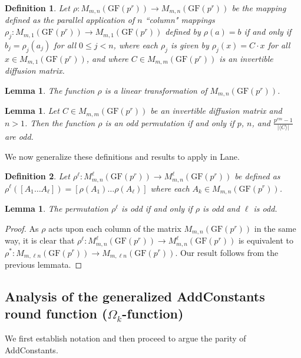 \documentclass[11pt]{amsart}
\newcommand{\GF}{\mathrm{GF}}
\newtheorem{definition}{{\bf Definition}}
\newtheorem{lemma}[theorem]{{\bf Lemma }}
\begin{document}
\begin{definition}
Let $\rho: M_{m,n}(\GF(p^r))\rightarrow M_{m,n}(\GF(p^r))$ be the mapping defined as the parallel application of $n$ ``column" mappings $\rho_j:M_{m,1}(\GF(p^r)) \to M_{m,1}(\GF(p^r))$ defined by $\rho(a)=b$ if and only if $b_j=\rho_j(a_j)$ for all $0 \le j < n$, where each $\rho_j$ is given by $\rho_j(x)=C\cdot x$ for all $x \in M_{m,1}(\GF(p^r))$, and where $C\in M_{m,m}(\GF(p^r)) $  is an invertible diffusion matrix.
\end{definition}
\begin{lemma}\label{MClinear} The function $\rho$  is a linear transformation of $M_{m,n}(\GF(p^r))$.
\end{lemma}
\begin{lemma}\label{MClemma}
Let $C\in M_{m,m}(\GF(p^r))$ be an invertible diffusion matrix and $n>1$.  Then the  function $\rho$ is an odd permutation if and only if  $p$, $n$, and $\frac{p^{rm}- 1}{\vert\langle C \rangle\vert}$ are odd.
\end{lemma}

We now generalize these definitions and results to apply in Lane.

\begin{definition}
Let $\rho^\ell : M^{\ell}_{m,n}(\GF(p^r)) \to M^\ell_{m,n}(\GF(p^r))$ be defined as\\ $\rho^\ell([A_1 \dots A_\ell]) = [\rho(A_1) \dots \rho(A_\ell)]$ where each $A_k \in M_{m,n}(\GF(p^r))$.
\end{definition}

\begin{lemma}
The permutation $\rho^\ell$ is odd if and only if $\rho$ is odd and $\ell$ is odd.
\end{lemma}
\begin{proof}
As $\rho$ acts upon each column of the matrix $M_{m,n}(\GF(p^r))$ in the same way, it is clear that $\rho^\ell : M^{\ell}_{m,n}(\GF(p^r)) \to M^{\ell}_{m,n}(\GF(p^r))$ is equivalent to $\rho^* : M_{m,\ell n}(\GF(p^r)) \to M_{m,\ell n}(\GF(p^r))$. Our result follows from the previous lemmata.
\end{proof}


\subsection{{\bf Analysis of the generalized AddConstants round function} ($\Omega_k$-function)}

We first establish notation and then proceed to argue the parity of AddConstants.
\end{document}
